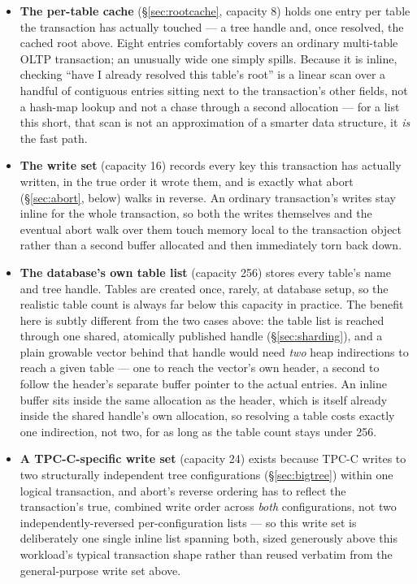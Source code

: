 \documentclass[11pt]{article}
\begin{document}
\begin{itemize}
  \item \textbf{The per-table cache} (\S\ref{sec:rootcache}, capacity 8) holds one entry
        per table the transaction has actually touched --- a tree handle and, once
        resolved, the cached root above. Eight entries comfortably covers an
        ordinary multi-table OLTP transaction; an unusually wide one simply spills.
        Because it is inline, checking ``have I already resolved this table's
        root'' is a linear scan over a handful of contiguous entries sitting next
        to the transaction's other fields, not a hash-map lookup and not a chase
        through a second allocation --- for a list this short, that scan is not an
        approximation of a smarter data structure, it \emph{is} the fast path.
  \item \textbf{The write set} (capacity 16) records every key this transaction has
        actually written, in the true order it wrote them, and is exactly what
        abort (\S\ref{sec:abort}, below) walks in reverse. An ordinary transaction's
        writes stay inline for the whole transaction, so both the writes
        themselves and the eventual abort walk over them touch memory local to the
        transaction object rather than a second buffer allocated and then
        immediately torn back down.
  \item \textbf{The database's own table list} (capacity 256) stores every table's
        name and tree handle. Tables are created once, rarely, at database
        setup, so the realistic table count is always far below this capacity in
        practice. The benefit here is subtly different from the two cases above:
        the table list is reached through one shared, atomically published handle
        (\S\ref{sec:sharding}), and a plain growable vector behind that handle
        would need \emph{two} heap indirections to reach a given table --- one to
        reach the vector's own header, a second to follow the header's separate
        buffer pointer to the actual entries. An inline buffer sits inside the
        same allocation as the header, which is itself already inside the shared
        handle's own allocation, so resolving a table costs exactly one
        indirection, not two, for as long as the table count stays under 256.
  \item \textbf{A TPC-C-specific write set} (capacity 24) exists because TPC-C
        writes to two structurally independent tree configurations
        (\S\ref{sec:bigtree}) within one logical transaction, and abort's reverse
        ordering has to reflect the transaction's true, combined write order
        across \emph{both} configurations, not two independently-reversed
        per-configuration lists --- so this write set is deliberately one single
        inline list spanning both, sized generously above this workload's typical
        transaction shape rather than reused verbatim from the general-purpose
        write set above.
\end{itemize}
\end{document}
